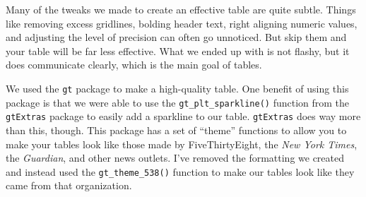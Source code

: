 \documentclass[
]{book}
\begin{document}
Many of the tweaks we made to create an effective table are quite subtle. Things like removing excess gridlines, bolding header text, right aligning numeric values, and adjusting the level of precision can often go unnoticed. But skip them and your table will be far less effective. What we ended up with is not flashy, but it does communicate clearly, which is the main goal of tables.

We used the \texttt{gt} package to make a high-quality table. One benefit of using this package is that we were able to use the \texttt{gt\_plt\_sparkline()} function from the \texttt{gtExtras} package to easily add a sparkline to our table. \texttt{gtExtras} does way more than this, though. This package has a set of ``theme'' functions to allow you to make your tables look like those made by FiveThirtyEight, the \emph{New York Times}, the \emph{Guardian}, and other news outlets. I've removed the formatting we created and instead used the \texttt{gt\_theme\_538()} function to make our tables look like they came from that organization.
\end{document}
